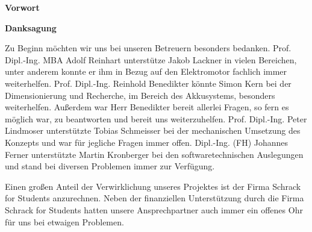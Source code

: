 \begin{center}
\begin{huge}
\textbf{Vorwort}
\end{huge}
\end{center}

\bigskip
{}


\newpage
\thispagestyle{empty}
\mbox{}
\newpage

\begin{center}
\begin{huge}
\textbf{Danksagung}
\end{huge}
\end{center}
\vspace{1cm}

Zu Beginn möchten wir uns bei unseren Betreuern besonders bedanken. Prof. Dipl.-Ing. MBA Adolf Reinhart unterstütze Jakob Lackner in vielen Bereichen, unter anderem konnte er ihm in Bezug auf den Elektromotor fachlich immer weiterhelfen. Prof. Dipl.-Ing. Reinhold Benedikter könnte Simon Kern bei der Dimensionierung und Recherche, im Bereich des Akkusystems, besonders weiterhelfen. Außerdem war Herr Benedikter bereit allerlei Fragen, so fern es möglich war, zu beantworten und bereit uns weiterzuhelfen. Prof. Dipl.-Ing. Peter Lindmoser unterstützte Tobias Schmeisser bei der mechanischen Umsetzung des Konzepts und war für jegliche Fragen immer offen. Dipl.-Ing. (FH) Johannes Ferner unterstützte Martin Kronberger bei den softwaretechnischen Auslegungen und stand bei diversen Problemen immer zur Verfügung.

Einen großen Anteil der Verwirklichung unseres Projektes ist der Firma Schrack for Students anzurechnen. Neben der finanziellen Unterstützung durch die Firma Schrack for Students hatten unsere Ansprechpartner auch immer ein offenes Ohr für uns bei etwaigen Problemen.

